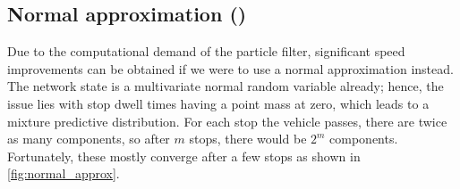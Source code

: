 \subsection{Normal approximation (\Fnorm{})}
\label{sec:prediction_arrival_time_normal}

Due to the computational demand of the particle filter, significant speed improvements can be obtained if we were to use a normal approximation instead. The network state is a multivariate normal random variable already; hence, the issue lies with stop dwell times having a point mass at zero, which leads to a mixture predictive distribution. For each stop the vehicle passes, there are twice as many components, so after $m$ stops, there would be $2^m$ components. Fortunately, these mostly converge after a few stops as shown in \cref{fig:normal_approx}.

